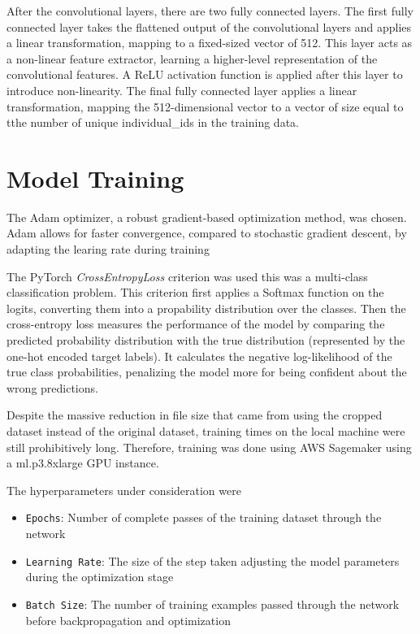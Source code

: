 \documentclass{article}
\begin{document}
After the convolutional layers, there are two fully connected layers. The first fully connected layer takes the flattened output of the convolutional layers and applies a linear transformation, mapping to a fixed-sized vector of 512. This layer acts as a non-linear feature extractor, learning a higher-level representation of the convolutional features. A ReLU activation function is applied after this layer to introduce non-linearity.
The final fully connected layer applies a linear transformation, mapping the 512-dimensional vector to a vector of size equal to tthe number of unique individual\_ids in the training data.


\section{Model Training}

The Adam optimizer, a robust gradient-based optimization method, was chosen. Adam allows for faster convergence, compared to stochastic gradient descent, by adapting the learing rate during training \cite{kingma2017adam}

The PyTorch \emph{CrossEntropyLoss} criterion \cite{cross_entropy_loss} was used this was a multi-class classification problem. This criterion first applies a Softmax function on the logits, converting them into a propability distribution over the classes. Then the cross-entropy loss measures the performance of the model by comparing the predicted probability distribution with the true distribution (represented by the one-hot encoded target labels). It calculates the negative log-likelihood of the true class probabilities, penalizing the model more for being confident about the wrong predictions.

Despite the massive reduction in file size that came from using the cropped dataset instead of the original dataset, training times on the local machine were still prohibitively long. Therefore, training was done using AWS Sagemaker using a ml.p3.8xlarge GPU instance.

The hyperparameters under consideration were

\begin{itemize}
    \item \verb|Epochs|: Number of complete passes of the training dataset through the network
    \item \verb|Learning Rate|: The size of the step taken adjusting the model parameters during the optimization stage
    \item \verb|Batch Size|: The number of training examples passed through the network before backpropagation and optimization
\end{itemize}
\end{document}
